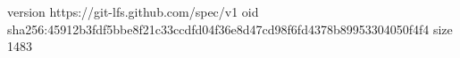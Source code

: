 version https://git-lfs.github.com/spec/v1
oid sha256:45912b3fdf5bbe8f21c33ccdfd04f36e8d47cd98f6fd4378b89953304050f4f4
size 1483
